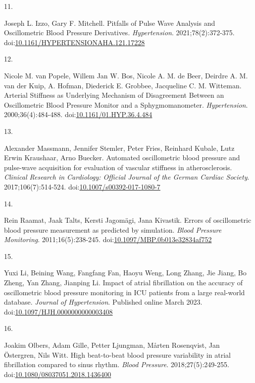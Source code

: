 \documentclass[
  12pt,
  letterpaper,
  openany,
  oneside]{book}
\newlength{\cslhangindent}
\newlength{\csllabelwidth}
\newenvironment{CSLReferences}[2] %
 {\begin{list}{}{%
  \setlength{\itemindent}{0pt}
  \setlength{\leftmargin}{0pt}
  \setlength{\parsep}{0pt}
  \ifodd #1
   \setlength{\leftmargin}{\cslhangindent}
   \setlength{\itemindent}{-1\cslhangindent}
  \fi
  \setlength{\itemsep}{#2\baselineskip}}}
 {\end{list}}
\newcommand{\CSLLeftMargin}[1]{\parbox[t]{\csllabelwidth}{\strut#1\strut}}
\newcommand{\CSLRightInline}[1]{\parbox[t]{\linewidth - \csllabelwidth}{\strut#1\strut}}
\begin{document}
\begin{CSLReferences}{0}{1}
\CSLLeftMargin{11. }%
\CSLRightInline{Joseph L. Izzo, Gary F. Mitchell. Pitfalls of {Pulse}
{Wave} {Analysis} and {Oscillometric} {Blood} {Pressure} {Derivatives}.
\emph{Hypertension}. 2021;78(2):372-375.
doi:\href{https://doi.org/10.1161/HYPERTENSIONAHA.121.17228}{10.1161/HYPERTENSIONAHA.121.17228}}

\CSLLeftMargin{12. }%
\CSLRightInline{Nicole M. van Popele, Willem Jan W. Bos, Nicole A. M. de
Beer, Deirdre A. M. van der Kuip, A. Hofman, Diederick E. Grobbee,
Jacqueline C. M. Witteman. Arterial {Stiffness} as {Underlying}
{Mechanism} of {Disagreement} {Between} an {Oscillometric} {Blood}
{Pressure} {Monitor} and a {Sphygmomanometer}. \emph{Hypertension}.
2000;36(4):484-488.
doi:\href{https://doi.org/10.1161/01.HYP.36.4.484}{10.1161/01.HYP.36.4.484}}

\CSLLeftMargin{13. }%
\CSLRightInline{Alexander Massmann, Jennifer Stemler, Peter Fries,
Reinhard Kubale, Lutz Erwin Kraushaar, Arno Buecker. Automated
oscillometric blood pressure and pulse-wave acquisition for evaluation
of vascular stiffness in atherosclerosis. \emph{Clinical Research in
Cardiology: Official Journal of the German Cardiac Society}.
2017;106(7):514-524.
doi:\href{https://doi.org/10.1007/s00392-017-1080-7}{10.1007/s00392-017-1080-7}}

\CSLLeftMargin{14. }%
\CSLRightInline{Rein Raamat, Jaak Talts, Kersti Jagomägi, Jana Kivastik.
Errors of oscillometric blood pressure measurement as predicted by
simulation. \emph{Blood Pressure Monitoring}. 2011;16(5):238-245.
doi:\href{https://doi.org/10.1097/MBP.0b013e32834af752}{10.1097/MBP.0b013e32834af752}}

\CSLLeftMargin{15. }%
\CSLRightInline{Yuxi Li, Beining Wang, Fangfang Fan, Haoyu Weng, Long
Zhang, Jie Jiang, Bo Zheng, Yan Zhang, Jianping Li. Impact of atrial
fibrillation on the accuracy of oscillometric blood pressure monitoring
in {ICU} patients from a large real-world database. \emph{Journal of
Hypertension}. Published online March 2023.
doi:\href{https://doi.org/10.1097/HJH.0000000000003408}{10.1097/HJH.0000000000003408}}

\CSLLeftMargin{16. }%
\CSLRightInline{Joakim Olbers, Adam Gille, Petter Ljungman, Mårten
Rosenqvist, Jan Östergren, Nils Witt. High beat-to-beat blood pressure
variability in atrial fibrillation compared to sinus rhythm. \emph{Blood
Pressure}. 2018;27(5):249-255.
doi:\href{https://doi.org/10.1080/08037051.2018.1436400}{10.1080/08037051.2018.1436400}}


\end{CSLReferences}
\end{document}
